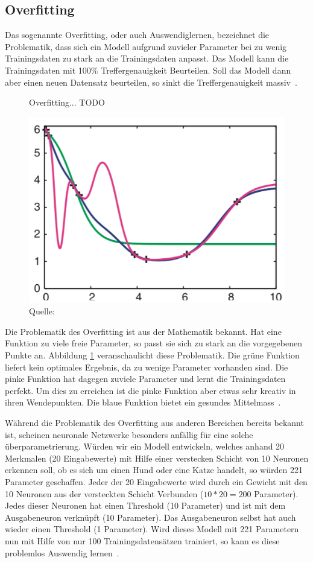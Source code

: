 \subsection{Overfitting}


Das sogenannte Overfitting, oder auch Auswendiglernen, bezeichnet die Problematik, dass sich ein Modell aufgrund zuvieler Parameter bei zu wenig Trainingsdaten zu stark an die Trainingsdaten anpasst. Das Modell kann die Trainingsdaten mit 100\% Treffergenauigkeit Beurteilen. Soll das Modell dann aber einen neuen Datensatz beurteilen, so sinkt die Treffergenauigkeit massiv~\autocite{Krogh2008}.

\begin{figure}[h]
    \caption{Overfitting... TODO}
    \label{krogh:d}
    \centering
    \includegraphics[width=0.4\linewidth]{graphics/krogh/krogh_overfitting.png}
    \caption*{Quelle: \textcite{Krogh2008}}
\end{figure}

Die Problematik des Overfitting ist aus der Mathematik bekannt. Hat eine Funktion zu viele freie Parameter, so passt sie sich zu stark an die vorgegebenen Punkte an. Abbildung \ref{krogh:d} veranschaulicht diese Problematik. Die grüne Funktion liefert kein optimales Ergebnis, da zu wenige Parameter vorhanden sind. Die pinke Funktion hat dagegen zuviele Parameter und lernt die Trainingsdaten perfekt. Um dies zu erreichen ist die pinke Funktion aber etwas sehr kreativ in ihren Wendepunkten. Die blaue Funktion bietet ein gesundes Mittelmass~\autocite{Krogh2008}.

Während die Problematik des Overfitting aus anderen Bereichen bereits bekannt ist, scheinen neuronale Netzwerke besonders anfällig für eine solche überparametrierung. Würden wir ein Modell entwickeln, welches anhand 20 Merkmalen (20 Eingabewerte) mit Hilfe einer verstecken Schicht von 10 Neuronen erkennen soll, ob es sich um einen Hund oder eine Katze handelt, so würden 221 Parameter geschaffen. Jeder der 20 Eingabewerte wird durch ein Gewicht mit den 10 Neuronen aus der versteckten Schicht Verbunden ($10 * 20 = 200$ Parameter). Jedes dieser Neuronen hat einen Threshold (10 Parameter) und ist mit dem Ausgabeneuron verknüpft (10 Parameter). Das Ausgabeneuron selbst hat auch wieder einen Threshold (1 Parameter). Wird dieses Modell mit 221 Parametern nun mit Hilfe von nur 100 Trainingsdatensätzen trainiert, so kann es diese problemlos Auswendig lernen~\autocite{Krogh2008}.

